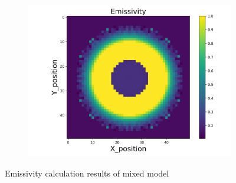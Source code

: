 \begin{figure}[p]
\begin{minipage}{\textwidth}
\begin{subfigure}{0.325\textwidth}
            \centering
            \includegraphics[width=\textwidth]{figures/raw_data/33/mix/emi_cal.jpg}
        \end{subfigure}
    \end{minipage}
    \caption{Emissivity calculation results of mixed model}  
\end{figure}